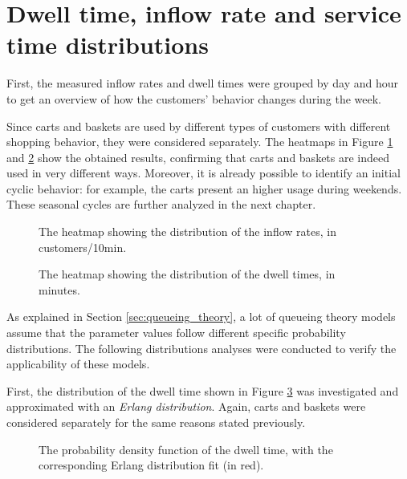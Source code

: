 \section{Dwell time, inflow rate and service time distributions}
\label{sec:dwell_time_inflow_rate_service_time_distributions}

First, the measured inflow rates and dwell times were grouped by day and hour to get an overview of how the customers’ behavior changes during the week.

Since carts and baskets are used by different types of customers with different shopping behavior, they were considered separately. The heatmaps in Figure \ref{fig:inflow_rate_heatmap} and \ref{fig:dwell_time_heatmap} show the obtained results, confirming that carts and baskets are indeed used in very different ways. Moreover, it is already possible to identify an initial cyclic behavior: for example, the carts present an higher usage during weekends. These seasonal cycles are further analyzed in the next chapter.

\begin{figure}
  \begin{center}
  \end{center}
  \caption{The heatmap showing the distribution of the inflow rates, in customers/10min.}
  \label{fig:inflow_rate_heatmap}
\end{figure}

\begin{figure}
  \begin{center}
  \end{center}
  \caption{The heatmap showing the distribution of the dwell times, in minutes.}
  \label{fig:dwell_time_heatmap}
\end{figure}

As explained in Section \ref{sec:queueing_theory}, a lot of queueing theory models assume that the parameter values follow different specific probability distributions. The following distributions analyses were conducted to verify the applicability of these models.

First, the distribution of the dwell time shown in Figure \ref{fig:dwell_time_distribution} was investigated and approximated with an \emph{Erlang distribution}. Again, carts and baskets were considered separately for the same reasons stated previously.

\begin{figure}
  \begin{center}
  \end{center}
  \caption{The probability density function of the dwell time, with the corresponding Erlang distribution fit (in red).}
  \label{fig:dwell_time_distribution}
\end{figure}

